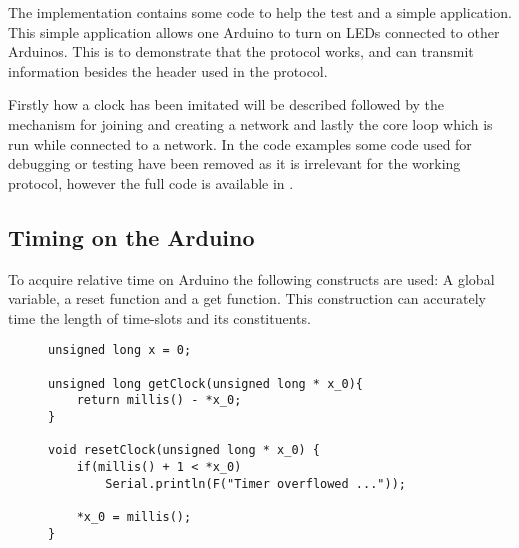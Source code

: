 \noindent
The implementation contains some code to help the test and a simple application. 
This simple application allows one Arduino to turn on LEDs connected to other Arduinos. 
This is to demonstrate that the protocol works, and can transmit information besides the header used in the protocol. 

Firstly how a clock has been imitated will be described followed by the mechanism for joining and creating a network and lastly the core loop which is run while connected to a network.
In the code examples some code used for debugging or testing have been removed as it is irrelevant for the working protocol, however the full code is available in . 

\subsection{Timing on the Arduino}
To acquire relative time on Arduino the following constructs are used: A global variable, a reset function and a get function. 
This construction can accurately time the length of time-slots and its constituents. 
\begin{figure}
\begin{lstlisting}[style=customc,caption={The variable and functions used to implement timing.},label={lst:ccrc:timing}]
unsigned long x = 0;

unsigned long getClock(unsigned long * x_0){
    return millis() - *x_0; 
}

void resetClock(unsigned long * x_0) {
    if(millis() + 1 < *x_0)
        Serial.println(F("Timer overflowed ..."));

    *x_0 = millis();
}
\end{lstlisting}
\end{figure}
